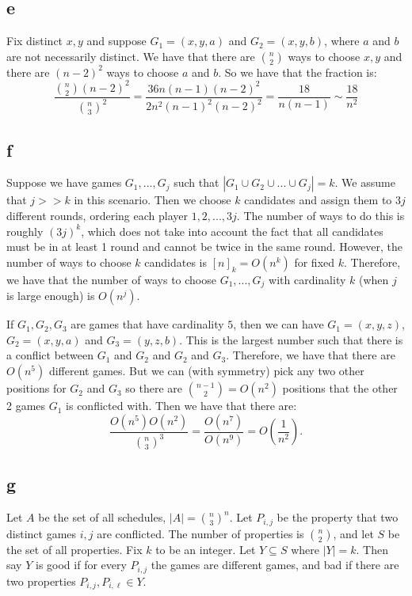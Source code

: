 \documentclass[]{article}
\theoremstyle{definition}
\numberwithin{theorem}{section}
\numberwithin{equation}{section}
\begin{document}
\subsection{e}
Fix distinct $x, y$ and suppose $G_1 = (x, y, a)$ and $G_2 = (x, y, b)$, where $a $ and $b$ are not necessarily distinct. We have that there are $\binom{n}{2}$ ways to choose $x,y$ and there are $(n-2)^2$ ways to choose $a$ and $b$. So we have that the fraction is:
\begin{equation}
	\frac{\binom{n}{2} (n - 2)^2}{\binom{n}{3}^2} = \frac{36 n (n-1) (n-2)^2 }{2 n^2 (n-1)^2(n-2)^2} = \frac{18}{n (n-1)} \sim \frac{18}{n^2}
\end{equation}

\subsection{f}
Suppose we have games $G_1, ..., G_j$ such that $|G_1 \cup G_2 \cup ... \cup G_j| = k$. We assume that $j >> k$ in this scenario. Then we choose $k$ candidates and assign them to $3j$ different rounds, ordering each player $1, 2, ..., 3j$. The number of ways to do this is roughly $(3j)^k$, which does not take into account the fact that all candidates must be in at least 1 round and cannot be twice in the same round. However, the number of ways to choose $k$ candidates is $[n]_k  = O(n^k)$ for fixed $k$. Therefore, we have that the number of ways to choose $G_1, ..., G_j$ with cardinality $k$ (when $j$ is large enough) is $O(n^j)$. 
\par
If $G_1, G_2, G_3$ are games that have cardinality $5$, then we can have $G_1 = (x, y, z)$, $G_2 = (x, y, a)$ and $G_3 = (y, z, b)$. This is the largest number such that there is a conflict between $G_1$ and $G_2$ and $G_2$ and $G_3$. Therefore, we have that there are $O(n^5)$ different games. But we can (with symmetry) pick any two other positions for $G_2$ and $G_3$ so there are $\binom{n - 1 }{2} = O(n^2)$ positions that the other 2 games $G_1$ is conflicted with. Then we have that there are:
\begin{equation}
	\frac{O(n^5) O(n^2)}{\binom{n}{3}^3} = \frac{O(n^7)}{O(n^9)} = O(\frac{1}{n^2}).
\end{equation}

\subsection{g}
Let $A$ be the set of all schedules, $|A| = \binom{n}{3}^n$. 
Let $P_{i,j}$ be the property that two distinct games $i, j$ are conflicted. The number of properties is $\binom{n}{2}$, and let $S$ be the set of all properties. 
Fix $k$ to be an integer. 
Let $Y \subseteq S$ where $|Y| = k$. Then say $Y$ is good if for every $P_{i, j}$ the games are different games, and bad if there are two properties $P_{i, j}, P_{i, \ell} \in Y$. 
\end{document}
